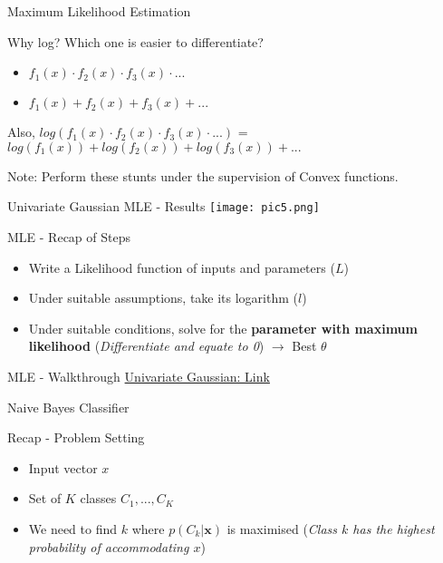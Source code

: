 \documentclass{beamer}
\begin{document}
\begin{frame}
    Maximum Likelihood Estimation
\end{frame}

\begin{frame}{Why log?}
    Which one is easier to differentiate?
    \begin{itemize}
        \item $f_1(x) \cdot f_2(x) \cdot f_3(x) \cdot ...$
        \item $f_1(x) + f_2(x) + f_3(x) + ...$
    \end{itemize}
    
    \vspace{15pt}
    
    Also, $log(f_1(x) \cdot f_2(x) \cdot f_3(x) \cdot ...)$ = $log (f_1(x)) + log (f_2(x)) + log (f_3(x)) + ...$
    
    \vspace{10pt}
    
    Note: Perform these stunts under the supervision of Convex functions.
\end{frame}

\begin{frame}{Univariate Gaussian MLE - Results}
    \texttt{[image: pic5.png]}
\end{frame}

\begin{frame}{MLE - Recap of Steps}
\begin{itemize}
    \item Write a Likelihood function of inputs and parameters ($L$)
    \item Under suitable assumptions, take its logarithm ($l$)
    \item Under suitable conditions, solve for the \textbf{parameter with maximum likelihood} (\textit{Differentiate and equate to 0}) $\rightarrow$ Best $\theta$
\end{itemize}
\end{frame}

\begin{frame}{MLE - Walkthrough}
    \href{https://statproofbook.github.io/P/ug-mle}{Univariate Gaussian: Link}
\end{frame}

\begin{frame}
    Naive Bayes Classifier
\end{frame}

\begin{frame}{Recap - Problem Setting}
    \begin{itemize}
        \item Input vector \textbf{$x$}
        \item Set of $K$ classes $C_1, ..., C_K$
        \item We need to find $k$ where $p(C_k | \textbf{x})$ is maximised (\textit{Class $k$ has the highest probability of accommodating $x$})
    \end{itemize}
\end{frame}
\end{document}
